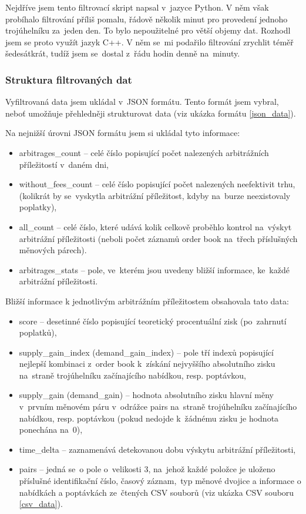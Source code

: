 \documentclass[thesis=B,czech]{FITthesis}[2019/03/21]
\begin{document}
Nejdříve jsem tento filtrovací skript napsal v~jazyce Python. V něm však probíhalo filtrování příliš pomalu, řádově několik minut pro provedení jednoho trojúhelníku za~jeden den. To bylo nepoužitelné pro větší objemy dat. Rozhodl jsem se proto využít jazyk C++. V něm se~mi podařilo filtrování zrychlit téměř šedesátkrát, tudíž jsem se~dostal z~řádu hodin denně na~minuty.

\subsubsection{Struktura filtrovaných dat}
Vyfiltrovaná data jsem ukládal v~JSON formátu. Tento formát jsem vybral, neboť umožňuje přehledněji strukturovat data (viz ukázka formátu \ref{json_data}).

Na nejnižší úrovni JSON formátu jsem si ukládal tyto informace:
\begin{itemize}
    \item arbitrages\_count -- celé číslo popisující počet nalezených arbitrážních příležitostí v~daném dni,
    \item without\_fees\_count -- celé číslo popisující počet nalezených neefektivit trhu, (kolikrát by se~vyskytla arbitrážní příležitost, kdyby na~burze neexistovaly poplatky), 
    \item all\_count -- celé číslo, které udává kolik celkově proběhlo kontrol na~výskyt arbitrážní příležitosti (neboli počet záznamů order book na~třech \linebreak příslušných měnových párech).
    \item arbitrages\_stats -- pole, ve~kterém jsou uvedeny bližší informace, ke~každé arbitrážní příležitosti. 
\end{itemize}
Bližší informace k jednotlivým arbitrážním příležitostem obsahovala tato data:
\begin{itemize}
    \item score -- desetinné číslo popisující teoretický procentuální zisk (po~zahrnutí poplatků),
    \item supply\_gain\_index (demand\_gain\_index) -- pole tří indexů popisující nejlepší kombinaci z~order book k~získání nejvyššího absolutního zisku na~straně trojúhelníku začínajícího nabídkou, resp. poptávkou,
    \item supply\_gain (demand\_gain) -- hodnota absolutního zisku hlavní měny v~prvním měnovém páru v~odrážce pairs na~straně trojúhelníku začínajícího nabídkou, resp. poptávkou (pokud nedojde k~žádnému zisku je hodnota ponechána na~0),
    \item time\_delta -- zaznamenává detekovanou dobu výskytu arbitrážní \linebreak příležitosti, 
    \item pairs -- jedná se~o pole o~velikosti 3, na~jehož každé položce je uloženo příslušné identifikační číslo, časový záznam,~typ měnové dvojice a informace o nabídkách a poptávkách ze~čtených CSV souborů (viz ukázka CSV souboru \ref{csv_data}).
\end{itemize}
\end{document}
